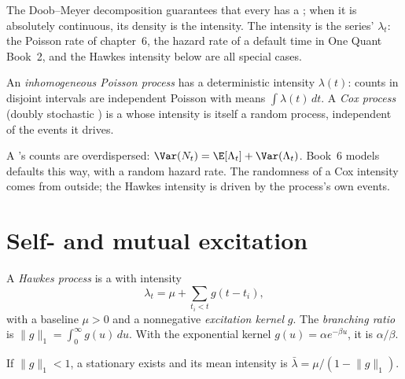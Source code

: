 The Doob--Meyer decomposition guarantees that every  has a ; when it is
absolutely continuous, its density is the intensity. The intensity is the series' $\lambda_t$: the Poisson
rate of chapter~6, the hazard rate of a default time in One Quant Book~2, and the Hawkes intensity
below are all special cases.

\begin{definition}\label{def:qm:point-processes-and-hawkes-processes:cox}
An \emph{inhomogeneous Poisson process} has a deterministic intensity
$\lambda(t)$: counts in disjoint intervals are independent Poisson with means $\int\lambda(t)\,dt$. A \emph{Cox
process} (doubly stochastic ) is a  whose intensity is
itself a random process, independent of the events it drives.
\end{definition}

A 's counts are overdispersed: $\Var(N_t) = \E[\Lambda_t] + \Var(\Lambda_t)$. Book~6 models defaults
this way, with a random hazard rate. The randomness of a Cox intensity comes from outside; the Hawkes
intensity is driven by the process's own events.

\section{Self- and mutual excitation}

\begin{definition}\label{def:qm:point-processes-and-hawkes-processes:hawkes}
A \emph{Hawkes process} is a  with intensity
\[
\lambda_t = \mu + \sum_{t_i < t}g(t - t_i),
\]
with a baseline $\mu > 0$ and a nonnegative \emph{excitation kernel} $g$. The
\emph{branching ratio} is $\lVert g\rVert_1 = \int_0^\infty g(u)\,du$. With the exponential
kernel $g(u) = \alpha e^{-\beta u}$, it is $\alpha/\beta$.
\end{definition}

\begin{proposition}\label{prop:qm:point-processes-and-hawkes-processes:mean}
If $\lVert g\rVert_1 < 1$, a stationary  exists and its mean intensity is $\bar\lambda =
\mu/(1 - \lVert g\rVert_1)$.
\end{proposition}

